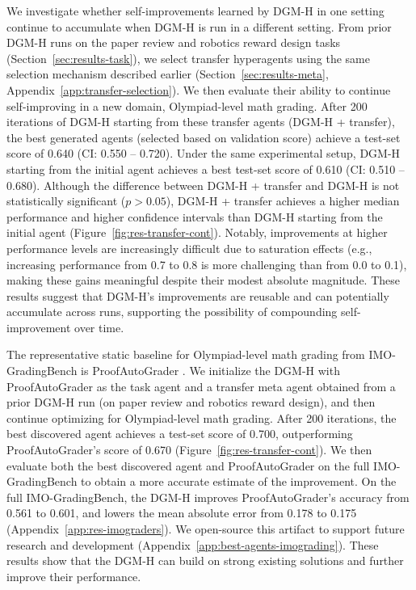 We investigate whether self-improvements learned by DGM-H in one setting continue to accumulate when DGM-H is run in a different setting. From prior DGM-H runs on the paper review and robotics reward design tasks (Section~\ref{sec:results-task}), we select transfer hyperagents using the same selection mechanism described earlier (Section~\ref{sec:results-meta}, Appendix~\ref{app:transfer-selection}). We then evaluate their ability to continue self-improving in a new domain, Olympiad-level math grading. After 200 iterations of DGM-H starting from these transfer agents (DGM-H + transfer), the best generated agents (selected based on validation score) achieve a test-set score of 0.640 (CI: 0.550 -- 0.720). Under the same experimental setup, DGM-H starting from the initial agent achieves a best test-set score of 0.610 (CI: 0.510 -- 0.680). Although the difference between DGM-H + transfer and DGM-H is not statistically significant ($p > 0.05$), DGM-H + transfer achieves a higher median performance and higher confidence intervals than DGM-H starting from the initial agent (Figure~\ref{fig:res-transfer-cont}). Notably, improvements at higher performance levels are increasingly difficult due to saturation effects (e.g., increasing performance from 0.7 to 0.8 is more challenging than from 0.0 to 0.1), making these gains meaningful despite their modest absolute magnitude. These results suggest that DGM-H's improvements are reusable and can potentially accumulate across runs, supporting the possibility of compounding self-improvement over time.

The representative static baseline for Olympiad-level math grading from IMO-GradingBench is ProofAutoGrader \citep{luong2025towards}. We initialize the DGM-H with ProofAutoGrader as the task agent and a transfer meta agent obtained from a prior DGM-H run (on paper review and robotics reward design), and then continue optimizing for Olympiad-level math grading. After 200 iterations, the best discovered agent achieves a test-set score of 0.700, outperforming ProofAutoGrader's score of 0.670 (Figure~\ref{fig:res-transfer-cont}). We then evaluate both the best discovered agent and ProofAutoGrader on the full IMO-GradingBench to obtain a more accurate estimate of the improvement. On the full IMO-GradingBench, the DGM-H improves ProofAutoGrader's accuracy from 0.561 to 0.601, and lowers the mean absolute error from 0.178 to 0.175 (Appendix~\ref{app:res-imograders}). We open-source this artifact to support future research and development (Appendix~\ref{app:best-agents-imograding}). These results show that the DGM-H can build on strong existing solutions and further improve their performance.

